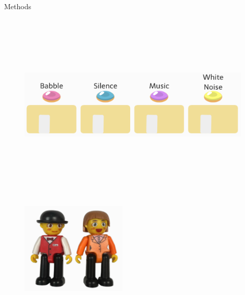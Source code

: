 \documentclass[final]{beamer}
\newlength{\colwidth}
\begin{document}
\begin{frame}[t]
\begin{columns}[t]
\begin{column}{\colwidth}
\begin{block}{Methods}
\begin{itemize}
    \end{itemize}

    \begin{figure}
      \includegraphics[width = 12in, height = 3.5in]{../writeup/figs/houses.png}
    \end{figure}
    
    \begin{figure}
      \hfill
      \includegraphics[width = 2in, height = 2in]{../writeup/figs/joemandy.png} \hspace{3in}
    \end{figure}

    \vspace{-0.8in}


\end{block}
\end{column}
\end{columns}
\end{frame}
\end{document}
